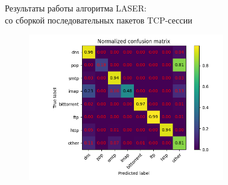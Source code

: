 \documentclass[10pt]{beamer}
\begin{document}
\begin{frame}{Результаты работы алгоритма LASER: \\ со сборкой последовательных пакетов TCP-сессии}
    \begin{figure}
        \begin{adjustwidth}{-2em}{-2em}
            \centering
            \includegraphics[width=23em]{results/laser_reasm/Normalized_confusion_matrix.png}
        \end{adjustwidth}
    \end{figure}
\end{frame}
\end{document}
